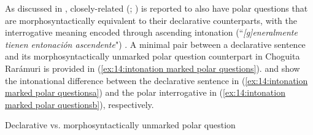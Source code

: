     \z
\z

As discussed in , closely-related  (; ) is reported to also have polar questions that are morphosyntactically equivalent to their declarative counterparts, with the interrogative meaning encoded through ascending intonation (``\textit{[g]eneralmente tienen entonación ascendente}") \citep[112]{miller1996guarijio}. A minimal pair between a declarative sentence and its morphosyntactically unmarked polar question counterpart in Choguita Rarámuri is provided in (\ref{ex:14:intonation marked polar questions}).  and  show the intonational difference between the declarative sentence in (\ref{ex:14:intonation marked polar questionsa}) and the polar interrogative in (\ref{ex:14:intonation marked polar questionsb}), respectively.

\pagebreak

\ea\label{ex:14:intonation marked polar questions}
{Declarative vs. morphosyntactically unmarked polar question}

